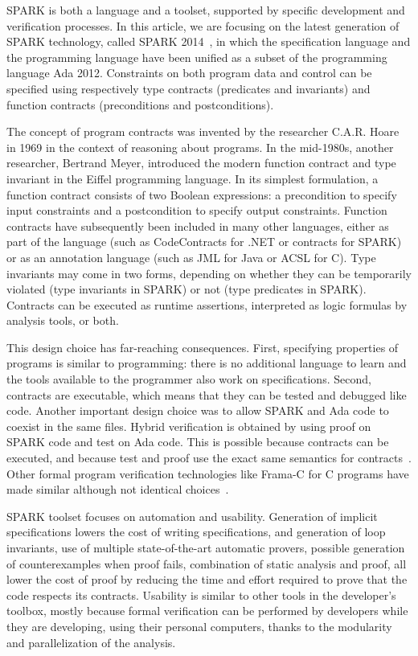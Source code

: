 \documentclass{llncs}
\begin{document}
SPARK is both a language and a toolset, supported by specific development and
verification processes. In this article, we are focusing on the latest
generation of SPARK technology, called SPARK 2014~\cite{sparkERTS2014}, in
which the specification language and the programming language have been unified
as a subset of the programming language Ada 2012. Constraints on both program
data and control can be specified using respectively type contracts (predicates
and invariants) and function contracts (preconditions and
postconditions).

The concept of program contracts was invented by the researcher C.A.R. Hoare in
1969 in the context of reasoning about programs. In the mid-1980s, another
researcher, Bertrand Meyer, introduced the modern function contract and type
invariant in the Eiffel programming language.  In its simplest formulation, a
function contract consists of two Boolean expressions: a precondition to
specify input constraints and a postcondition to specify output constraints.
Function contracts have subsequently been included in many other languages,
either as part of the language (such as CodeContracts for .NET or contracts for
SPARK) or as an annotation language (such as JML for Java or ACSL for C). Type
invariants may come in two forms, depending on whether they can be temporarily
violated (type invariants in SPARK) or not (type predicates in
SPARK). Contracts can be executed as runtime assertions, interpreted as logic
formulas by analysis tools, or both.

This design choice has far-reaching consequences. First, specifying properties
of programs is similar to programming: there is no additional language to learn
and the tools available to the programmer also work on specifications. Second,
contracts are executable, which means that they can be tested and debugged like
code. Another important design choice was to allow SPARK and Ada code to
coexist in the same files. Hybrid verification is obtained by using proof on
SPARK code and test on Ada code. This is possible because contracts can be
executed, and because test and proof use the exact same semantics for
contracts~\cite{tseChalin10}. Other formal program verification technologies
like Frama-C for C programs have made similar although not identical
choices~\cite{kosmatov:hal-01344110}.

SPARK toolset focuses on automation and usability. Generation of implicit
specifications lowers the cost of writing specifications, and generation of
loop invariants, use of multiple state-of-the-art automatic provers, possible
generation of counterexamples when proof fails, combination of static analysis
and proof, all lower the cost of proof by reducing the time and effort required
to prove that the code respects its contracts. Usability is similar to other
tools in the developer’s toolbox, mostly because formal verification can be
performed by developers while they are developing, using their personal
computers, thanks to the modularity and parallelization of the analysis.
\end{document}
